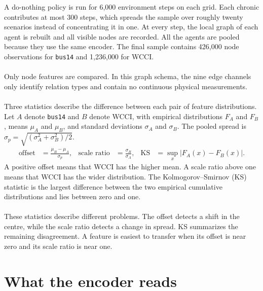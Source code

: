 A do-nothing policy is run for 6{,}000 environment steps on
each grid. Each chronic contributes at most 300 steps, which spreads the sample
over roughly twenty scenarios instead of concentrating it in one. At every
step, the local graph of each agent is rebuilt and all visible nodes are
recorded. All the agents are pooled because they use the same encoder. The final
sample contains 426{,}000 node observations for \texttt{bus14} and
1{,}236{,}000 for WCCI.
\\
\\
Only node features are compared. In this graph schema, the nine
edge channels only identify relation types and contain no continuous physical
measurements.
\\
\\
Three statistics describe the difference between each pair of
feature distributions. Let $A$ denote \texttt{bus14} and $B$ denote WCCI, with
empirical distributions $F_A$ and $F_B$, means $\mu_A$ and $\mu_B$, and
standard deviations $\sigma_A$ and $\sigma_B$. The pooled spread is
$\sigma_p=\sqrt{(\sigma_A^2+\sigma_B^2)/2}$.
\begin{align}
  \text{offset} &= \frac{\mu_B-\mu_A}{\sigma_p},
  &\text{scale ratio} &= \frac{\sigma_B}{\sigma_A},
  &\mathrm{KS} &= \sup_x |F_A(x)-F_B(x)| . \label{eq:offset-scale}
\end{align}
A positive offset means that WCCI has the higher mean. A scale
ratio above one means that WCCI has the wider distribution. The
Kolmogorov--Smirnov (KS) statistic is the largest difference between the two
empirical cumulative distributions and lies between zero and one.
\\
\\
These statistics describe different problems. The offset
detects a shift in the centre, while the scale ratio detects a change in spread.
KS summarizes the remaining disagreement. A feature is easiest to transfer
when its offset is near zero and its scale ratio is near one.


\section{What the encoder reads}
\label{sec:wcci-features}

